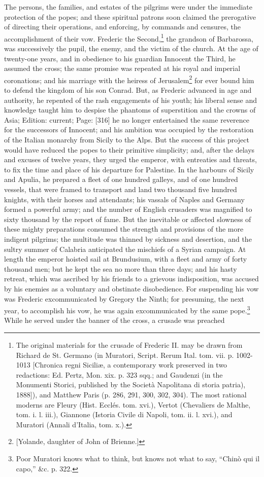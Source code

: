 The persons, the families, and estates of the pilgrims were under the immediate protection of the popes; and these spiritual patrons soon claimed the prerogative of directing their operations, and enforcing, by commands and censures, the accomplishment of their vow. Frederic the Second,\footnote{The original materials for the crusade of Frederic II. may be drawn from Richard de St. Germano (in Muratori, Script. Rerum Ital. tom. vii. p. 1002-1013 [Chronica regni Siciliæ, a contemporary work preserved in two redactions: Ed. Pertz, Mon. xix. p. 323 sqq.; and Gaudenzi (in the Monumenti Storici, published by the Società Napolitana di storia patria), 1888]), and Matthew Paris (p. 286, 291, 300, 302, 304). The most rational moderns are Fleury (Hist. Ecclés. tom. xvi.), Vertot (Chevaliers de Malthe, tom. i. l. iii.), Giannone (Istoria Civile di Napoli, tom. ii. l. xvi.), and Muratori (Annali d\texthebrew{}’Italia, tom. x.).} the grandson of Barbarossa, was successively the pupil, the enemy, and the victim of the church. At the age of twenty-one years, and in obedience to his guardian Innocent the Third, he assumed the cross; the same promise was repeated at his royal and imperial coronations; and his marriage with the heiress of Jerusalem\footnote{[Yolande, daughter of John of Brienne.]} for ever bound him to defend the kingdom of his son Conrad. But, as Frederic advanced in age and authority, he repented of the rash engagements of his youth; his liberal sense and knowledge taught him to despise the phantoms of superstition and the crowns of Asia; Edition: current; Page: [316] he no longer entertained the same reverence for the successors of Innocent; and his ambition was occupied by the restoration of the Italian monarchy from Sicily to the Alps. But the success of this project would have reduced the popes to their primitive simplicity; and, after the delays and excuses of twelve years, they urged the emperor, with entreaties and threats, to fix the time and place of his departure for Palestine. In the harbours of Sicily and Apulia, he prepared a fleet of one hundred galleys, and of one hundred vessels, that were framed to transport and land two thousand five hundred knights, with their horses and attendants; his vassals of Naples and Germany formed a powerful army; and the number of English crusaders was magnified to sixty thousand by the report of fame. But the inevitable or affected slowness of these mighty preparations consumed the strength and provisions of the more indigent pilgrims; the multitude was thinned by sickness and desertion, and the sultry summer of Calabria anticipated the mischiefs of a Syrian campaign. At length the emperor hoisted sail at Brundusium, with a fleet and army of forty thousand men; but he kept the sea no more than three days; and his hasty retreat, which was ascribed by his friends to a grievous indisposition, was accused by his enemies as a voluntary and obstinate disobedience. For suspending his vow was Frederic excommunicated by Gregory the Ninth; for presuming, the next year, to accomplish his vow, he was again excommunicated by the same pope.\footnote{Poor Muratori knows what to think, but knows not what to say, \texthebrew{“}Chinò qui il capo,\texthebrew{}” \&c. p. 322.} While he served under the banner of the cross, a crusade was preached 